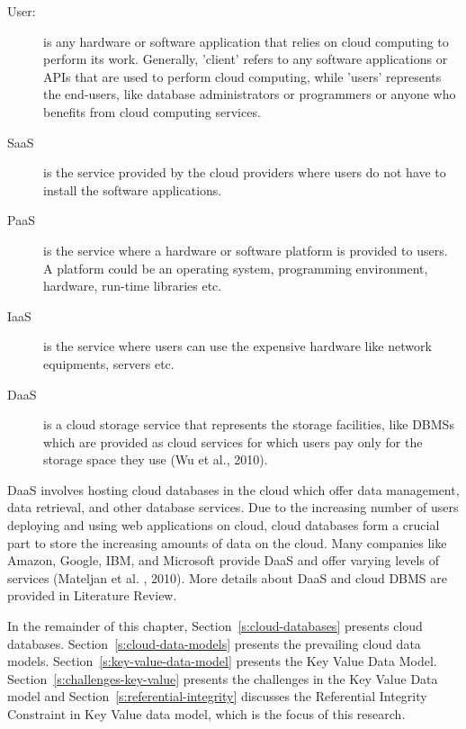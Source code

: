 \begin{description}

	\item [User:] is any hardware or software application that relies on cloud
	computing to perform its work.  Generally,   'client' refers to any software applications or
	\acp{API}  that are used to perform cloud computing,  
	while 'users' represents the end-users,   like  database administrators or
	programmers or anyone who benefits from cloud computing services. 
	
	\item [\acf{SaaS}] is the service provided by the cloud
	providers where users do not have to install the software applications. 
	
	\item [\acf{PaaS}] is the service where a hardware or
	software platform is provided to users.  A platform could be an operating system,  
	programming environment,   hardware,   run-time libraries etc. 
	
	\item [\acf{IaaS}] is the service where users can use
	the expensive hardware like network equipments,   servers etc. 
	
	\item [\acf{DaaS}] is a cloud storage service  that represents
	the storage facilities,   like  \acp{DBMS} which are provided
	as cloud services for which users pay only for the storage space they use (Wu et
	al.,  2010). 

\end{description}


\ac{DaaS} involves hosting cloud databases in the cloud which offer data
management,   data retrieval,   and other database services.  Due to the
increasing number of users deploying and using web applications on cloud,  
cloud databases form a crucial part to store the increasing amounts of data
on the cloud.  Many companies like Amazon,   Google,   IBM,   and Microsoft
provide \ac{DaaS} and offer varying levels of services (Mateljan et al. ,   2010).  More
details about \ac{DaaS} and cloud \ac{DBMS} are provided in Literature Review. 

In the remainder of this chapter,   Section~\ref{s:cloud-databases} presents cloud
databases.  Section~\ref{s:cloud-data-models} presents the prevailing cloud data
models.  Section~\ref{s:key-value-data-model} presents the Key Value Data Model. 
Section~\ref{s:challenges-key-value} presents the challenges in the Key Value
Data model and Section~\ref{s:referential-integrity} discusses the Referential
Integrity Constraint in Key Value data model,   which is the focus of this
research. 


